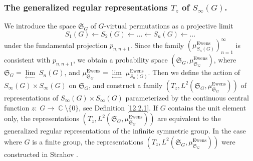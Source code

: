 \documentclass[12pt]{amsart}
\theoremstyle{definition}
\numberwithin{equation}{section}
\DeclareMathOperator{\C}{\mathbb{C}}
\DeclareMathOperator{\Ewens}{Ewens}
\begin{document}
\subsubsection{The generalized regular representations $T_z$ of $S_{\infty}(G)$.}
We introduce the space $\mathfrak{S}_G$ of $G$-virtual permutations as a projective limit
$$
S_1(G)\longleftarrow S_2(G)\longleftarrow\ldots\longleftarrow S_n(G)\longleftarrow\ldots
$$
under the fundamental projection $p_{n,n+1}$. Since the family $\left(\mu^{\Ewens}_{S_n(G)}\right)_{n=1}^{\infty}$ is consistent with $p_{n,n+1}$, we obtain a probability space
$\left(\mathfrak{S}_G, \mu_{\mathfrak{S}_G}^{\Ewens}\right)$, where
$\mathfrak{S}_G=\underset{\longleftarrow}{\lim}\;S_n(G)$, and $\mu_{\mathfrak{S}_G}^{\Ewens}
=\underset{\longleftarrow}{\lim}\;\mu^{\Ewens}_{S_n(G)}$. Then we define the action of $S_{\infty}(G)\times S_{\infty}(G)$ on $\mathfrak{S}_G$, and construct a family
$\left(T_z,L^2\left(\mathfrak{S}_G,\mu_{\mathfrak{S}_G}^{\Ewens}\right)\right)$
of representations of $S_{\infty}(G)\times S_{\infty}(G)$ parameterized by the continuous central function $z:\; G\longrightarrow \C\setminus\{0\}$, see Definition \ref{12.2.1}.
If $G$ contains the unit element only, the representations
$\left(T_z,L^2\left(\mathfrak{S}_G,\mu_{\mathfrak{S}_G}^{\Ewens}\right)\right)$
are equivalent to the generalized regular representations of the infinite symmetric group. In the case where $G$ is a finite group, the representations $\left(T_z,L^2\left(\mathfrak{S}_G,\mu_{\mathfrak{S}_G}^{\Ewens}\right)\right)$ were constructed in Strahov \cite{StrahovIsr25}.
\end{document}
